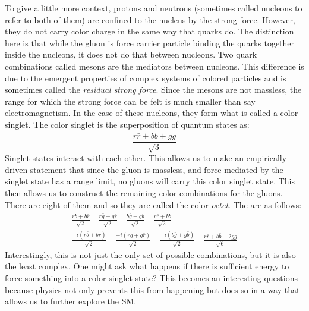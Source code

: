 To give a little more context, protons and neutrons (sometimes called nucleons to refer to both of them) are confined to the nucleus by the strong force.
However, they do not carry color charge in the same way that quarks do. The distinction here is that while the gluon is force carrier particle binding the quarks together inside the nucleons, it does not do that between nucleons.
Two quark combinations called mesons are the mediators between nucleons. This difference is due to the emergent properties of complex systems of colored particles and is sometimes called the \textit{residual strong force}. 
Since the mesons are not massless, the range for which the strong force can be felt is much smaller than say electromagnetism. In the case of these nucleons, they form what is called a color singlet. 
The color singlet is the superposition of quantum states as:
\begin{equation}
   \frac{r \bar{r} + b \bar{b} + g \bar{g}}{\sqrt{3}}
\end{equation}
Singlet states interact with each other. This allows us to make an empirically driven statement that since the gluon is massless, and force mediated by the singlet state has a range limit, no gluons will carry this color singlet state.
This then allows us to construct the remaining color combinations for the gluons. There are eight of them and so they are called the color \textit{octet}.
The are as follows:
\begin{gather}
   \frac{r \bar{b} + b \bar{r}}{\sqrt{2}} \quad \frac{r \bar{g} + g \bar{r}}{\sqrt{2}} \quad \frac{b \bar{g} + g \bar{b}}{\sqrt{2}} \quad \frac{r \bar{r} + b \bar{b}}{\sqrt{2}} \nonumber\\
   \frac{-i(r \bar{b} + b \bar{r})}{\sqrt{2}} \quad \frac{-i(r \bar{g} + g \bar{r})}{\sqrt{2}} \quad \frac{-i(b \bar{g} + g \bar{b})}{\sqrt{2}} \quad \frac{r \bar{r} + b \bar{b} - 2g \bar{g}}{\sqrt{6}}
   \label{eq:eq_colorOctet}
\end{gather}
Interestingly, this is not just the only set of possible combinations, but it is also the least complex. One might ask what happens if there is sufficient energy to force something into a color singlet state?
This becomes an interesting questions because physics not only prevents this from happening but does so in a way that allows us to further explore the SM.\\

